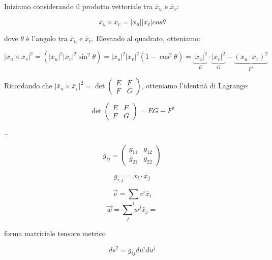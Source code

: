 Iniziamo considerando il prodotto vettoriale tra $\bar x_u$ e $\bar x_v$:

$$
\bar x_u \times \bar x_v = |\bar x_u| |\bar x_v| cos \theta
$$

dove $\theta$ è l'angolo tra $\bar x_u$ e $\bar x_v$. Elevando al quadrato, otteniamo:

$$
|\bar x_u \times \bar x_v|^2 = (|\bar x_u|^2 |\bar x_v|^2 \sin^2 \theta) = |\bar x_u|^2 |\bar x_v|^2 (1 - \cos^2 \theta) = \underbrace{|\bar x_u|^2}_E \cdot \underbrace{|\bar x_v|^2}_G - \underbrace{(\bar x_u \cdot \bar x_v)^2}_{F^2}
$$

Ricordando che $|\bar x_u \times \bar x_v|^2 = \det \begin{pmatrix} E & F \\ F & G \end{pmatrix}$, otteniamo l'identità di Lagrange:

$$
\det \begin{pmatrix} E & F \\ F & G \end{pmatrix} = EG - F^2
$$

\dots

\newpage

$$
g_{ij} = \begin{pmatrix}
    g_{11} & g_{12} \\
    g_{21} & g_{22}
\end{pmatrix}
$$

$$
g_{i,j} = \bar x_i \cdot \bar x_j
$$

$$
\vec v = \sum_i v^i \bar x_i
$$
$$
\vec w = \sum_j w^j \bar x_j = 
$$

forma matriciale tensore metrico

$$
ds^2 = g_{ij} du^i du^j
$$
